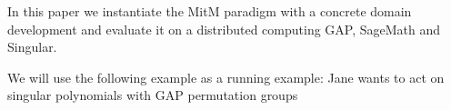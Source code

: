 In this paper we instantiate the MitM paradigm with a concrete domain development and evaluate it on a distributed computing GAP, SageMath and Singular.

We will use the following example as a running example: Jane wants to act on singular polynomials with GAP permutation groups


